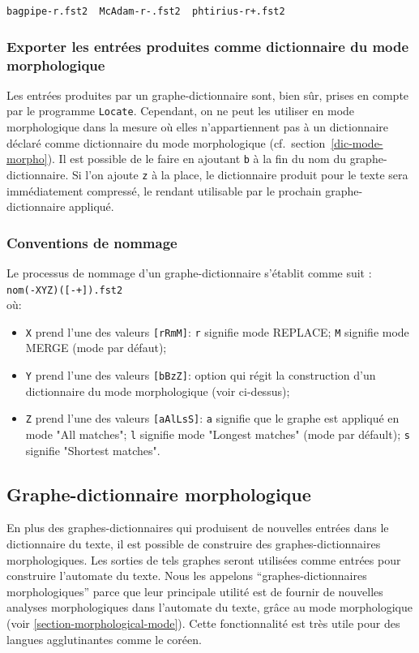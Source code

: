 \bigskip
\verb?bagpipe-r.fst2  McAdam-r-.fst2  phtirius-r+.fst2?


\subsubsection{Exporter les entrées produites comme dictionnaire du mode morphologique}
Les entrées produites par un graphe-dictionnaire sont, bien sûr, prises en compte
par le programme \verb+Locate+. Cependant, on ne peut les utiliser en mode morphologique
dans la mesure où elles n'appartiennent pas à un dictionnaire déclaré comme dictionnaire du mode morphologique (cf.~section~\ref{dic-mode-morpho}).
Il est possible de le faire en ajoutant \verb+b+ à la fin du nom du graphe-dictionnaire. 
Si l'on ajoute \verb+z+ à la place, le dictionnaire produit pour le texte sera immédiatement
compressé, le rendant utilisable par le prochain graphe-dictionnaire appliqué.
 
\subsubsection{Conventions de nommage}
Le processus de nommage d'un graphe-dictionnaire s'établit comme suit :\\

\verb$nom(-XYZ)([-+]).fst2$\\

\noindent où:
\begin{itemize}
\item \verb+X+ prend l'une des valeurs \verb+[rRmM]+: \verb+r+ signifie mode REPLACE; \verb+M+
signifie mode MERGE (mode par défaut);
\item \verb+Y+ prend l'une des valeurs \verb+[bBzZ]+: option qui régit la construction d'un
dictionnaire du mode morphologique (voir ci-dessus);
\item \verb+Z+ prend l'une des valeurs \verb+[aAlLsS]+: \verb+a+ signifie que le graphe est appliqué
en mode "All matches"; \verb+l+ signifie mode "Longest matches" (mode par défault); 
\verb+s+ signifie "Shortest matches".
\end{itemize}


\subsection{Graphe-dictionnaire morphologique}
En plus des graphes-dictionnaires qui produisent de nouvelles entrées dans le dictionnaire du
texte, il est possible de construire des graphes-dictionnaires morphologiques.
Les sorties de tels graphes seront utilisées comme entrées pour construire l'automate du texte. Nous
les appelons ``graphes-dictionnaires morphologiques'' parce que leur principale utilité est de
fournir de nouvelles analyses morphologiques dans l'automate du texte, grâce au mode morphologique
(voir \ref{section-morphological-mode}). Cette fonctionnalité est très utile pour des langues
agglutinantes comme le coréen.

